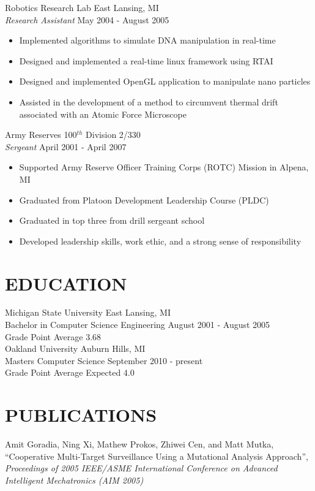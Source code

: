 \documentclass[line]{res}
\begin{document}
\begin{resume}
    \vspace{-2mm}
    Robotics Research Lab \hfill East Lansing, MI\\
    {\sl Research Assistant} \hfill May 2004 - August 2005
    \vspace{1mm}
    \begin{itemize} 
      \item Implemented algorithms to simulate DNA manipulation in real-time
      \item Designed and implemented a real-time linux framework using RTAI
      \item Designed and implemented OpenGL application to manipulate nano particles
      \item Assisted in the development of a method to circumvent thermal drift associated with an Atomic Force Microscope
    \end{itemize}

    \vspace{-2mm}
    Army Reserves \hfill 100$^{th}$ Division 2/330\\
    {\sl Sergeant} \hfill April 2001 - April 2007
    \vspace{1mm}
    \begin{itemize} 
      \item Supported Army Reserve Officer Training Corps (ROTC) Mission in Alpena, MI
      \item Graduated from Platoon Development Leadership Course (PLDC)
      \item Graduated in top three from drill sergeant school
      \item Developed leadership skills, work ethic, and a strong sense of responsibility      
    \end{itemize}
\section{EDUCATION} 
    Michigan State University \hfill East Lansing, MI\\
    Bachelor in Computer Science Engineering \hfill August 2001 - August 2005\\
    Grade Point Average 3.68\\

    Oakland University \hfill Auburn Hills, MI\\
    Masters Computer Science \hfill September 2010 - present\\
    Grade Point Average Expected 4.0\\
\section{PUBLICATIONS} 
        Amit Goradia, Ning Xi, Mathew Prokos, Zhiwei Cen, and Matt Mutka,
         ``Cooperative Multi-Target Surveillance Using a Mutational Analysis Approach'',
         \textsl{Proceedings of 2005 IEEE/ASME International Conference on Advanced Intelligent Mechatronics (AIM 2005)}


\end{resume}
\end{document}
